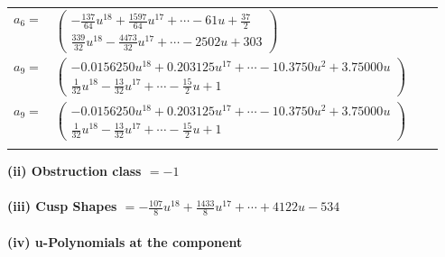 \documentclass[1p]{elsarticle_modified}
\theoremstyle{definition}
\begin{document}
\begin{tabular}{m{7pt} m{180pt} m{7pt} m{180pt} }
\flushright $a_{6}=$&$\begin{pmatrix}-\frac{137}{64} u^{18}+\frac{1597}{64} u^{17}+\cdots-61 u+\frac{37}{2}\\\frac{339}{32} u^{18}-\frac{4473}{32} u^{17}+\cdots-2502 u+303\end{pmatrix}$ \\
\flushright $a_{9}=$&$\begin{pmatrix}-0.0156250 u^{18}+0.203125 u^{17}+\cdots-10.3750 u^{2}+3.75000 u\\\frac{1}{32} u^{18}-\frac{13}{32} u^{17}+\cdots-\frac{15}{2} u+1\end{pmatrix}$\\ \flushright $a_{9}=$&$\begin{pmatrix}-0.0156250 u^{18}+0.203125 u^{17}+\cdots-10.3750 u^{2}+3.75000 u\\\frac{1}{32} u^{18}-\frac{13}{32} u^{17}+\cdots-\frac{15}{2} u+1\end{pmatrix}$\\&\end{tabular}
\flushleft \textbf{(ii) Obstruction class $= -1$}\\~\\
\flushleft \textbf{(iii) Cusp Shapes $= -\frac{107}{8} u^{18}+\frac{1433}{8} u^{17}+\cdots+4122 u-534$}\\~\\
\newpage\renewcommand{\arraystretch}{1}
\flushleft \textbf{(iv) u-Polynomials at the component}\newline \\
\end{document}
